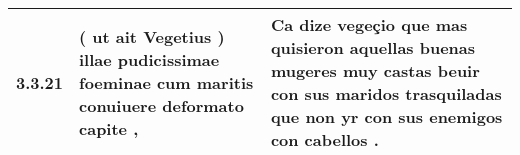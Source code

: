 \begin{tabular}{|p{1cm}|p{6.5cm}|p{6.5cm}|}

\hline
3.3.21 & ( ut ait Vegetius ) \textbf{ illae pudicissimae foeminae } cum maritis conuiuere deformato capite , & Ca dize vegeçio \textbf{ que mas quisieron aquellas buenas mugeres muy castas beuir con sus maridos trasquiladas } que non yr con sus enemigos con cabellos . \\\hline

\end{tabular}
